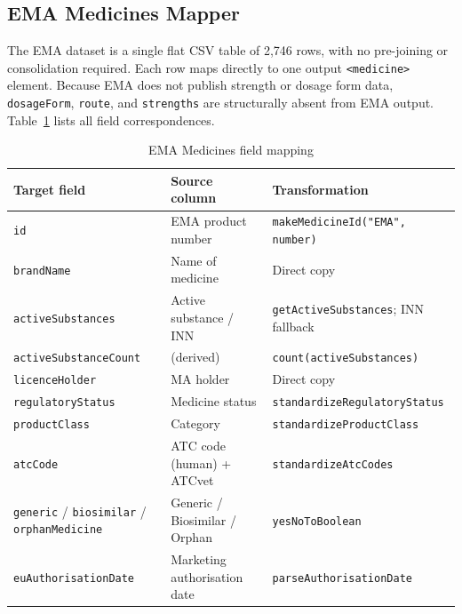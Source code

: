 \documentclass[a4paper,oneside,bibliography=totoc]{scrbook}
\begin{document}
\subsection{EMA Medicines Mapper}

The EMA dataset is a single flat CSV table of 2,746 rows, with no
pre-joining or consolidation required. Each row maps directly to one
output \texttt{<medicine>} element. Because EMA does not publish strength
or dosage form data, \texttt{dosageForm}, \texttt{route}, and
\texttt{strengths} are structurally absent from EMA output.
Table~\ref{tab:ema_mapping} lists all field correspondences.

\begin{table}[htbp]
\centering
\caption{EMA Medicines field mapping}
\label{tab:ema_mapping}
\scriptsize
\begin{tabular}{|l|l|l|}
\hline
\textbf{Target field} & \textbf{Source column} & \textbf{Transformation} \\
\hline
\texttt{id}                   & EMA product number           & \texttt{makeMedicineId("EMA", number)} \\
\texttt{brandName}            & Name of medicine             & Direct copy \\
\texttt{activeSubstances}     & Active substance / INN       & \texttt{getActiveSubstances}; INN fallback \\
\texttt{activeSubstanceCount} & (derived)                    & \texttt{count(activeSubstances)} \\
\texttt{licenceHolder}        & MA holder                    & Direct copy \\
\texttt{regulatoryStatus}     & Medicine status              & \texttt{standardizeRegulatoryStatus} \\
\texttt{productClass}         & Category                     & \texttt{standardizeProductClass} \\
\texttt{atcCode}              & ATC code (human) + ATCvet    & \texttt{standardizeAtcCodes} \\
\texttt{generic} / \texttt{biosimilar} / \texttt{orphanMedicine} & Generic / Biosimilar / Orphan & \texttt{yesNoToBoolean} \\
\texttt{euAuthorisationDate}  & Marketing authorisation date & \texttt{parseAuthorisationDate} \\
\hline
\end{tabular}
\end{table}
\end{document}
